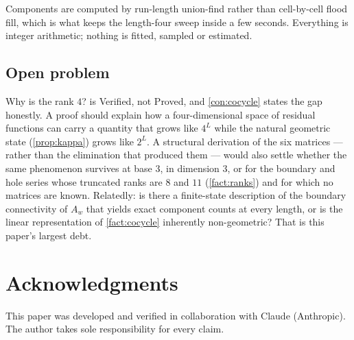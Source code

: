 \documentclass[11pt]{amsart}
\theoremstyle{definition}
\theoremstyle{remark}
\begin{document}
Components are computed by run-length union-find rather than cell-by-cell flood fill, which is what keeps the length-four sweep inside a few seconds. Everything is integer arithmetic; nothing is fitted, sampled or estimated.

\subsection*{Open problem}

Why is the rank $4$?  is Verified, not Proved, and \cref{con:cocycle} states the gap honestly. A proof should explain how a four-dimensional space of residual functions can carry a quantity that grows like $4^L$ while the natural geometric state (\cref{prop:kappa}) grows like $2^L$. A structural derivation of the six matrices --- rather than the elimination that produced them --- would also settle whether the same phenomenon survives at base $3$, in dimension $3$, or for the boundary and hole series whose truncated ranks are $8$ and $11$ (\cref{fact:ranks}) and for which no matrices are known. Relatedly: is there a finite-state description of the boundary connectivity of $A_w$ that yields exact component counts at every length, or is the linear representation of \cref{fact:cocycle} inherently non-geometric? That is this paper's largest debt.

\section*{Acknowledgments}

This paper was developed and verified in collaboration with Claude (Anthropic). The author takes sole responsibility for every claim.
\end{document}
